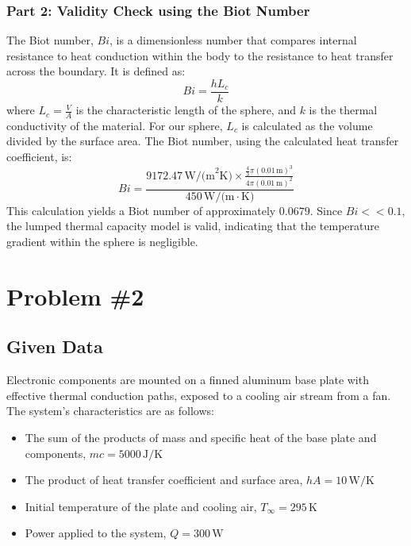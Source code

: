 \documentclass{article}
\numberwithin{equation}{section}
\begin{document}
\subsubsection*{Part 2: Validity Check using the Biot Number}
The Biot number, $Bi$, is a dimensionless number that compares internal resistance to heat conduction within the body to the resistance to heat transfer across the boundary. It is defined as:
\begin{equation}
    Bi = \frac{hL_c}{k}
\end{equation}
where $L_c = \frac{V}{A}$ is the characteristic length of the sphere, and $k$ is the thermal conductivity of the material. For our sphere, $L_c$ is calculated as the volume divided by the surface area.
\newline\newline
The Biot number, using the calculated heat transfer coefficient, is:
\begin{equation}
    Bi = \frac{9172.47 \, \text{W/(m}^2\text{K)} \times \frac{\frac{4}{3}\pi (0.01 \, \text{m})^3}{4\pi (0.01 \, \text{m})^2}}{450 \, \text{W/(m} \cdot \text{K)}}
\end{equation}
\noindent
This calculation yields a Biot number of approximately $0.0679$. Since $Bi << 0.1$, the lumped thermal capacity model is valid, indicating that the temperature gradient within the sphere is negligible.

\newpage
\section{Problem \#2}
\subsection*{Given Data}
Electronic components are mounted on a finned aluminum base plate with effective thermal conduction paths, exposed to a cooling air stream from a fan. The system's characteristics are as follows:
\begin{itemize}
    \item The sum of the products of mass and specific heat of the base plate and components, $mc = 5000 \, \text{J/K}$
    \item The product of heat transfer coefficient and surface area, $hA = 10 \, \text{W/K}$
    \item Initial temperature of the plate and cooling air, $T_{\infty} = 295 \, \text{K}$
    \item Power applied to the system, $Q = 300 \, \text{W}$
\end{itemize}
\end{document}
